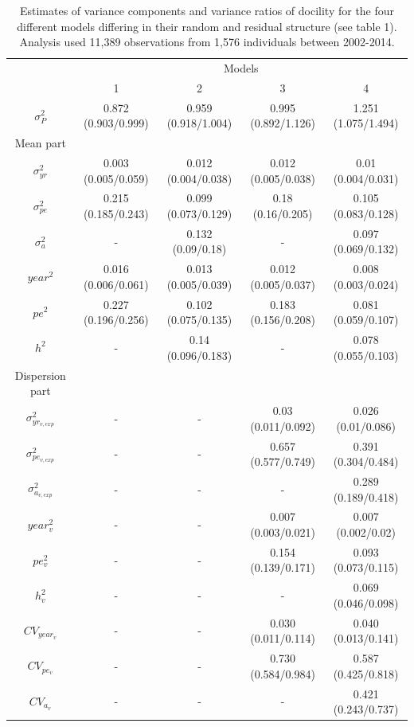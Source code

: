 \documentclass[a4paper,12pt,twoside]{article}
\begin{document}
	
	\begin{table}[ht!]
		\caption{Estimates of variance components and variance ratios of docility for the four different models differing in their random and residual structure (see table 1). 
			Analysis used 11,389 observations from 1,576 individuals between 2002-2014.}
		\label{Tab:estimates}
		\centering
		\small
		\begin{tabular}{c c c c c}
			\hline
			\multicolumn{1}{c}{} &
			\multicolumn{4}{c}{Models}\\
			& 1 & 2 & 3 & 4\\
			\hline
			$\sigma_P^2$ & 0.872 (0.903/0.999) & 0.959 (0.918/1.004) & 0.995 (0.892/1.126) & 1.251 (1.075/1.494)\\
			Mean part & & & &\\
			$\sigma_{yr}^{2}$ & 0.003 (0.005/0.059) & 0.012 (0.004/0.038) & 0.012 (0.005/0.038) & 0.01 (0.004/0.031)\\
			$\sigma_{pe}^2$ & 0.215 (0.185/0.243) & 0.099 (0.073/0.129) & 0.18 (0.16/0.205) & 0.105 (0.083/0.128)\\
			$\sigma_{a}^2$ & - & 0.132 (0.09/0.18) & - & 0.097 (0.069/0.132)\\
			$year^2$ & 0.016 (0.006/0.061) & 0.013 (0.005/0.039) & 0.012 (0.005/0.037) & 0.008 (0.003/0.024)\\
			$pe^2$ & 0.227 (0.196/0.256) & 0.102 (0.075/0.135) & 0.183 (0.156/0.208) & 0.081 (0.059/0.107)\\
			$h^2$ & - & 0.14 (0.096/0.183) & - & 0.078 (0.055/0.103)\\
			Dispersion part & & & &\\
			$\sigma_{yr_{v, exp}}^2$ & - & - & 0.03 (0.011/0.092) & 0.026 (0.01/0.086)\\
			$\sigma_{pe_{v, exp}}^2$ & - & - & 0.657 (0.577/0.749) & 0.391 (0.304/0.484)\\
			$\sigma_{a_{v, exp}}^2$ & - & - & - & 0.289 (0.189/0.418)\\
			$year_v^2$ & - & - & 0.007 (0.003/0.021) & 0.007 (0.002/0.02)\\
			$pe_v^2$ & - & - & 0.154 (0.139/0.171) & 0.093 (0.073/0.115)\\
			$h_v^2$ & - & - & - & 0.069 (0.046/0.098)\\
			$CV_{year_v}$ & - & - & 0.030 (0.011/0.114) & 0.040 (0.013/0.141)\\
			$CV_{pe_v}$ & - & - & 0.730 (0.584/0.984) & 0.587 (0.425/0.818)\\
			$CV_{a_v}$ & - & - & - & 0.421 (0.243/0.737)\\

\end{tabular}
\end{table}
\end{document}
